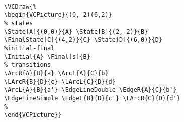 \documentclass[11pt,twoside]{article}
\newlength{\parindenttemp} %
\newcommand{\noi}{\noindent}
\newlength{\jsIndent}%
\newlength{\ColSource}%
\newlength{\ColFigur}%
\begin{document}
{\noi 
\hspace*{-\jsIndent}
\begin{minipage}[c]{\ColFigur+.5cm}%
\par\vspace*{0mm}%
\begin{center}

%
\end{center}
\end{minipage}%
\hspace*{1.2em}%
\begin{minipage}[c]{\ColSource-.5cm}
\setlength{\parindent}{\parindenttemp}%
\par\vspace*{0mm}%
\footnotesize
\begin{verbatim}

\VCDraw{%
\begin{VCPicture}{(0,-2)(6,2)}
% states
\State[A]{(0,0)}{A} \State[B]{(2,-2)}{B}
\FinalState[C]{(4,2)}{C} \State[D]{(6,0)}{D}
%initial-final
\Initial{A} \Final[s]{B}
% transitions 
\ArcR{A}{B}{a} \ArcL{A}{C}{b}
\LArcR{B}{D}{c} \LArcL{C}{D}{d}
\ArcL{A}{B}{a'} \EdgeLineDouble \EdgeR{A}{C}{b'}
\EdgeLineSimple \EdgeL{B}{D}{c'} \LArcR{C}{D}{d'}
%
\end{VCPicture}}
\end{verbatim}
\normalsize
\end{minipage}%

}
\end{document}
